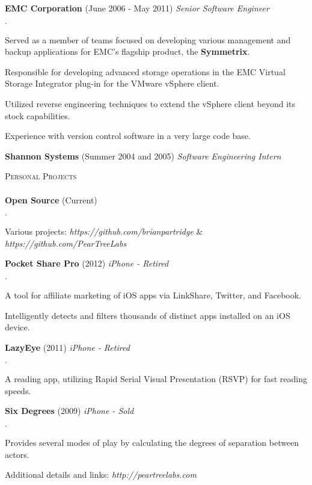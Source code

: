 \documentclass[11pt]{article}
\newcommand{\mydot}{$\cdot$ }
\newcommand{\lineunder}{\vspace*{-8pt} \\ \hspace*{-18pt} \hrulefill \\}
\newcommand{\header}[1]{{\hspace*{-15pt}\vspace*{6pt} \textsc{#1}} \vspace*{-6pt} \lineunder}
\newcommand{\employer}[3]{\textbf{#1} (#2) \emph{#3}\\  }
\newcommand{\project}[3]{\textbf{#1} (#2) \emph{#3}\\  }
\newenvironment{achievements}{\begin{list}{\mydot}{\topsep 0pt \itemsep -2pt}}{\vspace*{4pt}\end{list}}
\begin{document}
\employer{EMC Corporation}{June 2006 - May 2011}{Senior Software Engineer}
\begin{achievements}
  \item Served as a member of teams focused on developing various management and backup applications for EMC's flagship product, the \textbf{Symmetrix}.
  \item Responsible for developing advanced storage operations in the EMC Virtual Storage Integrator plug-in for the VMware vSphere client.
  \item Utilized reverse engineering techniques to extend the vSphere client beyond its stock capabilities.
  \item Experience with version control software in a very large code base.
\end{achievements}

\employer{Shannon Systems}{Summer 2004 and 2005}{Software Engineering Intern}
\vspace*{14pt}
  

\header{Personal Projects}
  \project{Open Source}{Current}{}{
  \begin{achievements}
    \item Various projects: \emph{https://github.com/brianpartridge} \& \emph{https://github.com/PearTreeLabs}
  \end{achievements}}
\project{Pocket Share Pro}{2012}{iPhone - Retired}{
\begin{achievements}
  \item A tool for affiliate marketing of iOS apps via LinkShare, Twitter, and Facebook.
  \item Intelligently detects and filters thousands of distinct apps installed on an iOS device.
\end{achievements}}  
\project{LazyEye}{2011}{iPhone - Retired}{
\begin{achievements}
  \item A reading app, utilizing Rapid Serial Visual Presentation (RSVP) for fast reading speeds.
\end{achievements}}
\project{Six Degrees}{2009}{iPhone - Sold}{
\begin{achievements}
  \item Provides several modes of play by calculating the degrees of separation between actors.
\end{achievements}}
Additional details and links: \emph{http://peartreelabs.com}\\  
\vspace*{14pt}
  
\end{document}
